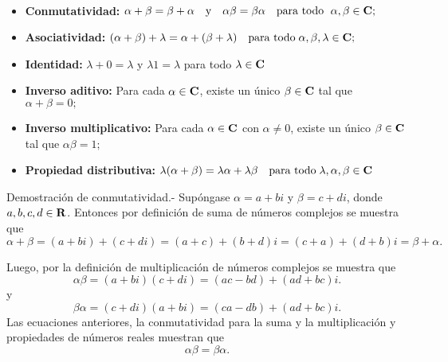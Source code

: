 \begin{tcolorbox}
    \begin{prop}\;\\
	\begin{itemize}
	    \item \textbf{Conmutatividad:}\;
		$\alpha + \beta = \beta + \alpha\quad \mbox{y}\quad \alpha \beta = \beta \alpha \quad \mbox{para todo }\; \alpha,\beta \in \bf{C};$

	    \item \textbf{Asociatividad:}\;
		$(\alpha + \beta )+\lambda = \alpha + (\beta + \lambda) \quad \mbox{para todo}\; \alpha,\beta,\lambda \in \bf{C};$

	    \item \textbf{Identidad:}\;
		$\lambda +0=\lambda $ y $\lambda 1 = \lambda$ para todo $\lambda \in \bf{C}$

	    \item \textbf{Inverso aditivo:}\;
		    Para cada $\alpha \in \bf{C}$, existe un único $\beta \in \bf{C}$ tal que $\alpha + \beta = 0;$

	    \item \textbf{Inverso multiplicativo:}\;
		    Para cada $\alpha \in \bf{C}$ con $\alpha \neq 0$, existe un único $\beta \in \bf{C}$ tal que $\alpha \beta = 1;$

	    \item \textbf{Propiedad distributiva:}\;
		$\lambda (\alpha + \beta) = \lambda \alpha + \lambda \beta \quad \mbox{para todo}\; \lambda, \alpha, \beta \in \bf{C}$
	\end{itemize}
    \end{prop}
\end{tcolorbox}

Demostración de conmutatividad.-\; Supóngase $\alpha=a+bi$ y $\beta=c+di$, donde $a,b,c,d \in \bf{R}$. Entonces por definición de suma de números complejos se muestra que
$$\alpha + \beta = (a+bi) + (c+di) = (a+c) + (b+d)i = (c+a) + (d+b)i = \beta + \alpha.$$

Luego, por la definición de multiplicación de números complejos se muestra que
$$\alpha \beta = (a+bi)(c+di) = (ac-bd)+(ad+bc)i.$$
y
$$\beta \alpha = (c+di)(a+bi) = (ca-db)+(ad+bc)i.$$
Las ecuaciones anteriores, la conmutatividad para la suma y la multiplicación y propiedades de números reales muestran que $$\alpha\beta = \beta \alpha.$$\\\\

